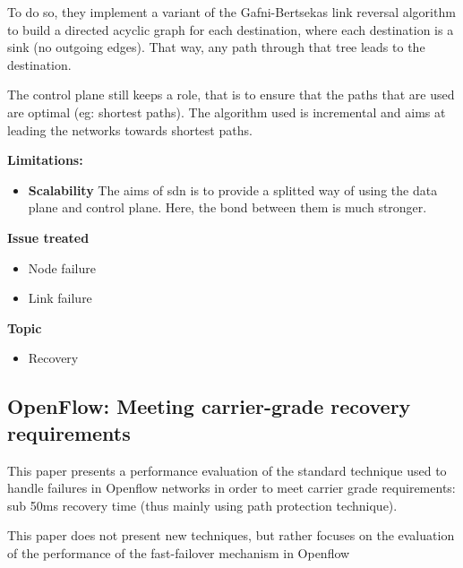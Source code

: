 \documentclass[compsoc]{IEEEtran}
\begin{document}
To do so, they implement a variant of the Gafni-Bertsekas link reversal algorithm to build a directed acyclic graph for each destination, where each destination is a sink (no outgoing edges). That way, any path through that tree leads to the destination.

The control plane still keeps a role, that is to ensure that the paths that are used are optimal (eg: shortest paths). The algorithm used is incremental and aims at leading the networks towards shortest paths.

\textbf{Limitations:}
\begin{itemize}
	\item \textbf{Scalability} The aims of sdn is to provide a splitted way of using the data plane and control plane. Here, the bond between them is much stronger.
\end{itemize}

\textbf{Issue treated}
\begin{itemize}
	\item Node failure
	\item Link failure
\end{itemize}

\textbf{Topic}
\begin{itemize}
	\item Recovery
\end{itemize}

\subsection{OpenFlow: Meeting carrier-grade recovery requirements \cite{Sharma:2013:OMC:2445634.2445903}}
This paper presents a performance evaluation of the standard technique used to handle failures in Openflow networks in order to meet carrier grade requirements: sub 50ms recovery time (thus mainly using path protection technique).

This paper does not present new techniques, but rather focuses on the evaluation of the performance of the fast-failover mechanism in Openflow
\end{document}
